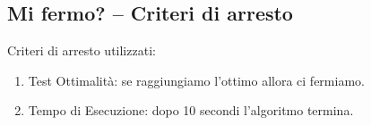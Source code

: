 \documentclass[10pt,a4paper]{article}
\begin{document}
    \subsection{Mi fermo? -- Criteri di arresto}
    \label{MiFermo?--CriteriDiArrestoSubsection}
    Criteri di arresto utilizzati:
    \begin{enumerate}
      \item Test Ottimalità: se raggiungiamo l’ottimo allora ci fermiamo.
      \item Tempo di Esecuzione: dopo 10 secondi l’algoritmo termina.
    \end{enumerate}
\end{document}
